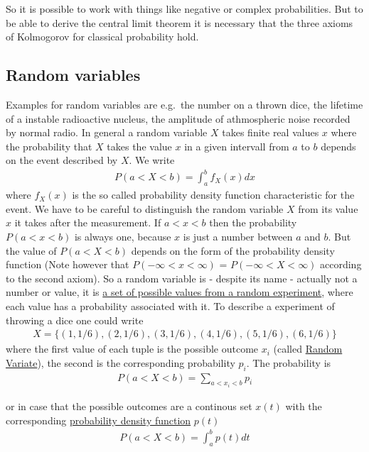 So it is possible to work with things like negative or complex
probabilities. But to be able to derive the central limit theorem it is
necessary that the three axioms of Kolmogorov for classical probability
hold.

\subsection{Random variables}
Examples for random variables are e.g.~the number on a thrown dice, the
lifetime of a instable radioactive nucleus, the amplitude of
athmospheric noise recorded by normal radio. In general a random
variable $X$ takes finite real values $x$ where the probability that
$X$ takes the value $x$ in a given intervall from $a$ to $b$
depends on the event described by $X$. We write 
\begin{align}
P(a < X < b) = \int_a^b f_X(x) dx 
\end{align} 
where $f_X(x)$ is the so called probability density function
characteristic for the event. We have to be careful to distinguish the
random variable $X$ from its value $x$ it takes after the
measurement. If $a < x < b$ then the probability $P(a < x < b)$ is
always one, because $x$ is just a number between $a$ and $b$. But
the value of $P(a < X < b)$ depends on the form of the probability
density function (Note however that $P(-\infty < x < \infty)$ =
$P(-\infty < X < \infty)$ according to the second axiom). So a random
variable is - despite its name - actually not a number or value, it is
\href{https://www.mathsisfun.com/data/random-variables.html}{a set of
possible values from a random experiment}, where each value has a
probability associated with it. To describe a experiment of throwing a
dice one could write 
\begin{align}
X = \{(1,1/6),(2,1/6),(3,1/6),(4,1/6),(5,1/6),(6,1/6)\}
\end{align} 
where the first value of each tuple is the possible outcome $x_i$
(called \href{https://en.wikipedia.org/wiki/Random_variate}{Random
Variate}), the second is the corresponding probability $p_i$. The
probability is 
\begin{align}
P(a < X < b) = \sum_{a < x_i < b} p_i  
\end{align}

or in case that the possible outcomes are a continous set $x(t)$ with
the corresponding
\href{https://en.wikipedia.org/wiki/Probability_density_function}{probability
density function} $p(t)$ 
\begin{align}
P(a < X < b) = \int_a^b p(t) dt  
\end{align}

